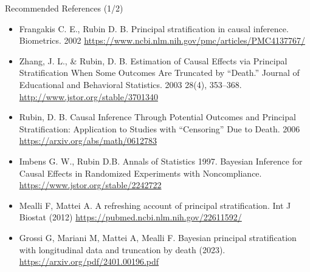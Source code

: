 \documentclass[10pt]{beamer}
\begin{document}
\begin{frame}{Recommended References \hfill {\small (1/2)}}

\footnotesize
\begin{itemize}

\item Frangakis C. E., Rubin D. B. Principal stratification in causal inference. Biometrics. 2002 {\tiny \url{https://www.ncbi.nlm.nih.gov/pmc/articles/PMC4137767/}}


\item 
Zhang, J. L., \& Rubin, D. B. Estimation of Causal Effects via Principal Stratification When Some Outcomes Are Truncated by “Death.” Journal of Educational and Behavioral Statistics. 2003 28(4), 353–368. {\tiny \url{http://www.jstor.org/stable/3701340}}

\item 
Rubin, D. B. Causal Inference Through Potential Outcomes and Principal Stratification: Application to Studies with “Censoring” Due to Death. 2006 {\tiny \url{https://arxiv.org/abs/math/0612783}}

\item 
Imbens G. W., Rubin D.B. Annals of Statistics 1997. Bayesian Inference for Causal Effects in Randomized Experiments with 
Noncompliance. 
{\tiny \url{https://www.jstor.org/stable/2242722}}

\item 
Mealli F, Mattei A. A refreshing account of principal stratification. Int J Biostat (2012) {\tiny \url{https://pubmed.ncbi.nlm.nih.gov/22611592/}}

\item 
Grossi G, Mariani M, Mattei A, Mealli F. Bayesian principal stratification with longitudinal data and 
truncation by death (2023). {\tiny \url{https://arxiv.org/pdf/2401.00196.pdf}}

\end{itemize}

\normalsize
\end{frame}
\end{document}
